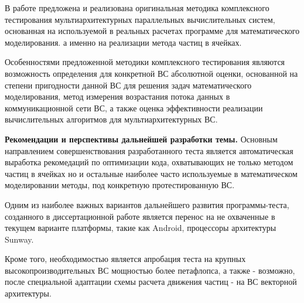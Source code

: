  В работе предложена и реализована оригинальная методика комплексного тестирования мультиархитектурных параллельных вычислительных систем, основанная на используемой в реальных расчетах программе для математического моделирования. а именно на реализации метода частиц в ячейках.
 
 Особенностями предложенной методики комплексного тестирования являются возможность определения для конкретной ВС абсолютной оценки, основанной на степени пригодности данной ВС для решения задач математического моделирования, метод измерения возрастания потока данных в коммуникационной сети ВС, а также оценка эффективности реализации вычислительных алгоритмов для мультиархитектурных ВС.
 
 \textbf{Рекомендации и перспективы дальнейшей разработки темы.}
 Основным направлением совершенствования разработанного теста является автоматическая выработка рекомедаций по оптимизации кода, охватывающих не только методом частиц в ячейках но и остальные наиболее часто используемые в математическом моделировании методы,  под конкретную протестированную ВС.
 
 Одним из наиболее важных вариантов дальнейшего развития программы-теста, созданного в диссертационной работе является перенос на не охваченные в текущем варианте платформы, такие как Android, процессоры архитектуры Sunway.
 
 Кроме того, необходимостью является апробация теста на крупных высокопроизводительных ВС мощностью более петафлопса, а также - возможно, после специальной адаптации схемы расчета движения частиц - на ВС векторной архитектуры.
 
 
 
 
 
  
 
 
